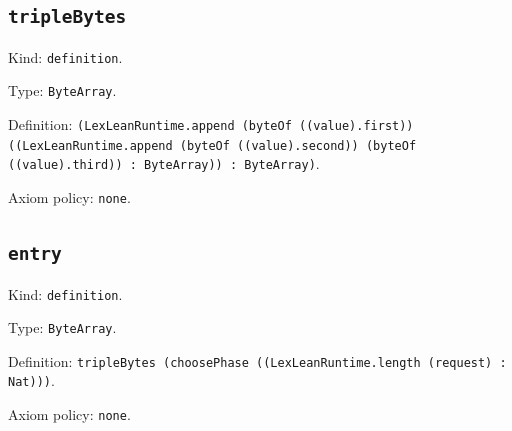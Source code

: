 \documentclass[11pt]{article}
\begin{document}
\subsection*{\texttt{tripleBytes}}
\noindent Kind: \texttt{definition}.\par
\noindent Type: \texttt{ByteArray}.\par
\noindent Definition: \texttt{(LexLeanRuntime.append (byteOf ((value).first)) ((LexLeanRuntime.append (byteOf ((value).second)) (byteOf ((value).third)) : ByteArray)) : ByteArray)}.\par
\noindent Axiom policy: \texttt{none}.\par
\subsection*{\texttt{entry}}
\noindent Kind: \texttt{definition}.\par
\noindent Type: \texttt{ByteArray}.\par
\noindent Definition: \texttt{tripleBytes (choosePhase ((LexLeanRuntime.length (request) : Nat)))}.\par
\noindent Axiom policy: \texttt{none}.\par
\end{document}
